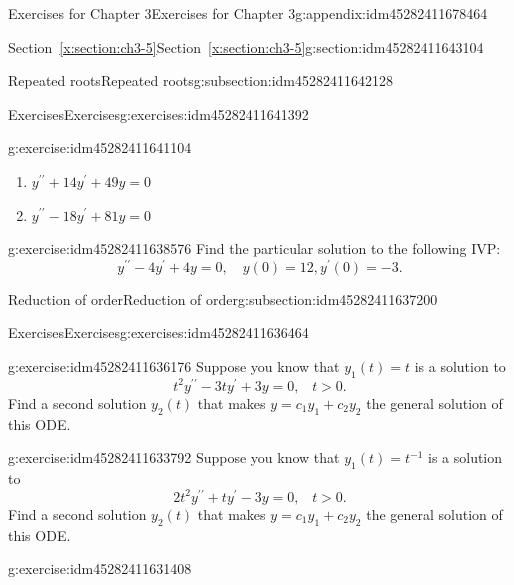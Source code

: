 \documentclass[oneside,10pt,]{book}
\numberwithin{equation}{section}
\numberwithin{equation}{section}
\begin{document}
\begin{appendixptx}{Exercises for Chapter 3}{}{Exercises for Chapter 3}{}{}{g:appendix:idm45282411678464}
\begin{sectionptx}{Section~\ref*{x:section:ch3-5}}{}{Section~\ref*{x:section:ch3-5}}{}{}{g:section:idm45282411643104}
\begin{subsectionptx}{Repeated roots}{}{Repeated roots}{}{}{g:subsection:idm45282411642128}
\begin{exercises-subsubsection-numberless}{Exercises}{}{Exercises}{}{}{g:exercises:idm45282411641392}
\begin{divisionexercise}{1}{}{}{g:exercise:idm45282411641104}
\begin{enumerate}[label=(\alph*)]
\item{}\({\displaystyle y^{\prime\prime}+14y^{\prime}+49y=0}\)%
\item{}\(y^{\prime\prime}-18y^{\prime}+81y=0\)%
\end{enumerate}
\end{divisionexercise}%
\begin{divisionexercise}{2}{}{}{g:exercise:idm45282411638576}%
Find the particular solution to the following IVP:%
\begin{equation*}
{\displaystyle y^{\prime\prime}-4y^{\prime}+4y=0},\,\,\,\,\,\,y(0)=12,y^{\prime}(0)=-3.
\end{equation*}
\end{divisionexercise}%
\end{exercises-subsubsection-numberless}
\end{subsectionptx}
%
%
\typeout{************************************************}
\typeout{************************************************}
%
\begin{subsectionptx}{Reduction of order}{}{Reduction of order}{}{}{g:subsection:idm45282411637200}
%
%
\typeout{************************************************}
\typeout{************************************************}
%
\begin{exercises-subsubsection-numberless}{Exercises}{}{Exercises}{}{}{g:exercises:idm45282411636464}
\begin{divisionexercise}{1}{}{}{g:exercise:idm45282411636176}%
Suppose you know that \(y_{1}(t)=t\) is a solution to%
\begin{equation*}
t^{2}y^{\prime\prime}-3ty^{\prime}+3y=0,\,\,\,\,\,t>0.
\end{equation*}
Find a second solution \(y_{2}(t)\) that makes \(y=c_{1}y_{1}+c_{2}y_{2}\) the general solution of this ODE.\end{divisionexercise}%
\begin{divisionexercise}{2}{}{}{g:exercise:idm45282411633792}%
Suppose you know that \(y_{1}(t)=t^{-1}\) is a solution to%
\begin{equation*}
2t^{2}y^{\prime\prime}+ty^{\prime}-3y=0,\,\,\,\,\,t>0.
\end{equation*}
Find a second solution \(y_{2}(t)\) that makes \(y=c_{1}y_{1}+c_{2}y_{2}\) the general solution of this ODE.\end{divisionexercise}%
\begin{divisionexercise}{3}{}{}{g:exercise:idm45282411631408}%

\end{divisionexercise}
\end{exercises-subsubsection-numberless}
\end{subsectionptx}
\end{sectionptx}
\end{appendixptx}
\end{document}
